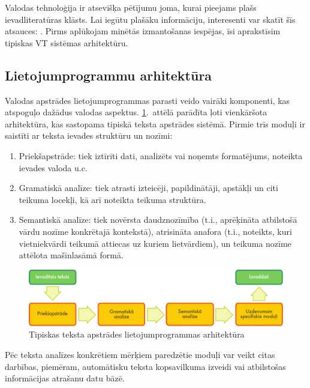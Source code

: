 \begin{multicols}{2}
Valodas tehnoloģija ir atsevišķa pētījumu joma, kurai pieejams plašs ievadliteratūras klāsts.  Lai iegūtu plašāku informāciju, interesenti var skatīt šīs atsauces: \cite{carstensen-etal1, jurafsky-martin01, manning-schuetze1, lt-world1, lt-survey1}.  Pirms aplūkojam minētās izmantošanas iespējas, īsi aprakstīsim tipiskas VT sistēmas arhitektūru.

\subsection{Lietojumprogrammu arhitektūra}

Valodas apstrādes lietojumprogrammas parasti veido vairāki komponenti, kas atspoguļo dažādus valodas aspektus.  \ref{fig:textprocessingarch_de}.~attēlā parādīta ļoti vienkāršota arhitektūra, kas sastopama tipiskā teksta apstrādes sistēmā.  Pirmie trīs moduļi ir saistīti ar teksta ievades struktūru un nozīmi:

\begin{enumerate}
\item  Priekšapstrāde: tiek iztīrīti dati, analizēts vai noņemts formatējums, noteikta ievades valoda u.c.
\item  Gramatiskā analīze: tiek atrasti izteicēji, papildinātāji, apstākļi un citi teikuma locekļi, kā arī noteikta teikuma struktūra.
\item  Semantiskā analīze: tiek novērsta daudznozīmība (t.i., aprēķināta atbilstošā vārdu nozīme konkrētajā kontekstā), atrisināta anafora (t.i., noteikts, kuri vietniekvārdi teikumā attiecas uz kuriem lietvārdiem), un teikuma nozīme attēlota mašīnlasāmā formā.
\end{enumerate}

\begin{figure}[htb]
  \center
  \includegraphics[width=\textwidth]{../_media/latvian/text_processing_app_architecture}
  \caption{Tipiskas teksta apstrādes lietojumprogrammas arhitektūra}
  \label{fig:textprocessingarch_de}
\end{figure}

Pēc teksta analīzes konkrētiem mērķiem paredzētie moduļi var veikt citas darbības, piemēram, automātisku teksta kopsavilkuma izveidi vai atbilstošas informācijas atrašanu datu bāzē.


\end{multicols}
